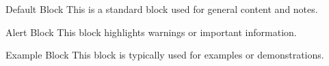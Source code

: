 \begin{block}{Default Block}
    This is a standard block used for general content and notes.
\end{block}

\begin{alertblock}{Alert Block}
    This block highlights warnings or important information.
\end{alertblock}

\begin{exampleblock}{Example Block}
    This block is typically used for examples or demonstrations.
\end{exampleblock}
